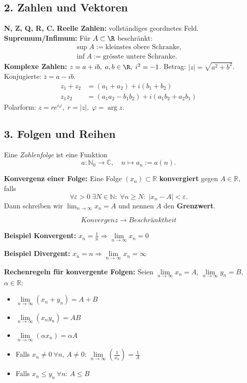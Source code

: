 \subsection{2. Zahlen und Vektoren}
\textbf{N, Z, Q, R, C.}  
\textbf{Reelle Zahlen:} vollständiges geordnetes Feld.  
\textbf{Supremum/Infimum:} Für $A\subset\R$ beschränkt:  
\begin{align*}
\sup A:=\text{kleinstes obere Schranke},\\
\inf A:=\text{grösste untere Schranke}.
\end{align*}
\textbf{Komplexe Zahlen:} $z=a+ib,\;a,b\in\R,\;i^2=-1$.  
Betrag: $|z|=\sqrt{a^2+b^2}$.  
Konjugierte: $\overline z=a-ib$.  
\begin{align*}
z_1 + z_2 &= (a_1 + a_2) + i(b_1 + b_2) \\
z_1 z_2 &= (a_1 a_2 - b_1 b_2) + i(a_1 b_2 + a_2 b_1)
\end{align*}
Polarform: $z=r e^{i\varphi},\;r=|z|,\;\varphi=\arg z$.

\subsection{3. Folgen und Reihen}  
Eine \emph{ Zahlenfolge} ist eine Funktion  
\[
a : \mathbb{N}_0 \to \mathbb{C}, \quad n \mapsto a_n := a(n).
\]  

\textbf{Konvergenz einer Folge:}  
Eine Folge \( (x_n) \subset \mathbb{R} \) \textbf{konvergiert} gegen \( A \in \mathbb{R} \), falls  
\[
\forall \varepsilon > 0\; \exists N \in \mathbb{N}:\; \forall n \geq N:\; |x_n - A| < \varepsilon.
\]  
Dann schreiben wir \( \lim_{n \to \infty} x_n = A \) und nennen \( A \) den \textbf{Grenzwert}.

\[
Konvergenz \to Beschränktheit
\]  

\textbf{Beispiel Konvergent:} \( x_n = \frac{1}{n} \Rightarrow \lim\limits_{n \to \infty} x_n = 0 \)

\textbf{Beispiel Divergent:} \( x_n = n \Rightarrow \lim\limits_{n \to \infty} x_n = \infty \)

\textbf{Rechenregeln für konvergente Folgen:}  
Seien \( \lim\limits_{n \to \infty} x_n = A \), \( \lim\limits_{n \to \infty} y_n = B \), \( \alpha \in \mathbb{R} \):

\begin{itemize}
  \item \( \lim\limits_{n \to \infty} (x_n + y_n) = A + B \)
  \item \( \lim\limits_{n \to \infty} (x_n y_n) = AB \)
  \item \( \lim\limits_{n \to \infty} (\alpha x_n) = \alpha A \)
  \item Falls \( x_n \neq 0\ \forall n \), \( A \neq 0 \):  
        \( \lim\limits_{n \to \infty} \left( \frac{1}{x_n} \right) = \frac{1}{A} \)
  \item Falls \( x_n \leq y_n\ \forall n \): \( A \leq B \)
\end{itemize}

